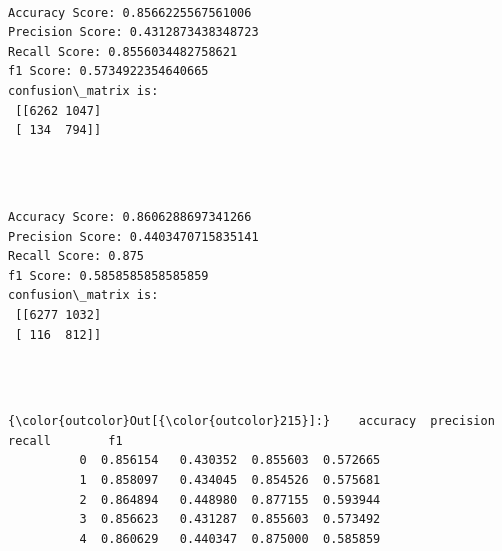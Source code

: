 \documentclass[11pt]{article}
\begin{document}
   

    \begin{center}
    \end{center}
    { \hspace*{\fill} \\}
    
   

    \begin{Verbatim}[commandchars=\\\{\}]
Accuracy Score: 0.8566225567561006
Precision Score: 0.4312873438348723
Recall Score: 0.8556034482758621
f1 Score: 0.5734922354640665
confusion\_matrix is: 
 [[6262 1047]
 [ 134  794]] 


    \end{Verbatim}

    \begin{center}
    \end{center}
    { \hspace*{\fill} \\}
    
    \begin{Verbatim}[commandchars=\\\{\}]
Accuracy Score: 0.8606288697341266
Precision Score: 0.4403470715835141
Recall Score: 0.875
f1 Score: 0.5858585858585859
confusion\_matrix is: 
 [[6277 1032]
 [ 116  812]] 


    \end{Verbatim}

   

    \begin{center}
    \end{center}
    { \hspace*{\fill} \\}
    
\begin{Verbatim}[commandchars=\\\{\}]
{\color{outcolor}Out[{\color{outcolor}215}]:}    accuracy  precision    recall        f1
          0  0.856154   0.430352  0.855603  0.572665
          1  0.858097   0.434045  0.854526  0.575681
          2  0.864894   0.448980  0.877155  0.593944
          3  0.856623   0.431287  0.855603  0.573492
          4  0.860629   0.440347  0.875000  0.585859
\end{Verbatim}
            
\end{document}
